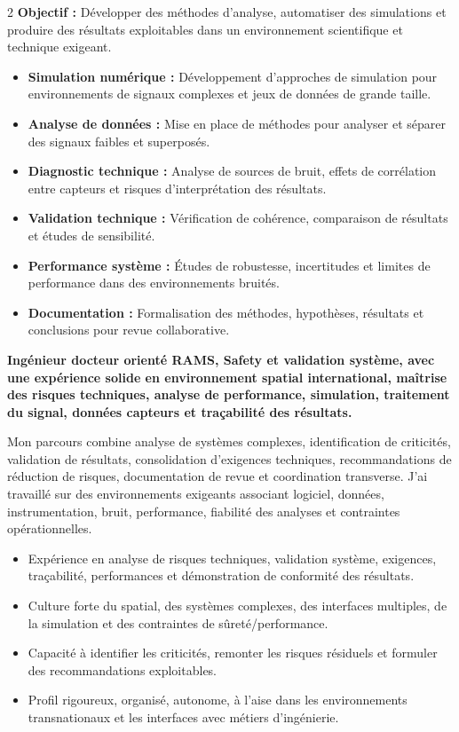 \documentclass[8pt,a4paper,ragged2e,withhyper]{altacv}
\begin{document}
\begin{paracol}{2}
\textbf{Objectif :} Développer des méthodes d’analyse, automatiser des simulations et produire des résultats exploitables dans un environnement scientifique et technique exigeant.

\begin{itemize}
  \item \textbf{Simulation numérique :} Développement d’approches de simulation pour environnements de signaux complexes et jeux de données de grande taille.
  \item \textbf{Analyse de données :} Mise en place de méthodes pour analyser et séparer des signaux faibles et superposés.
  \item \textbf{Diagnostic technique :} Analyse de sources de bruit, effets de corrélation entre capteurs et risques d’interprétation des résultats.
  \item \textbf{Validation technique :} Vérification de cohérence, comparaison de résultats et études de sensibilité.
  \item \textbf{Performance système :} Études de robustesse, incertitudes et limites de performance dans des environnements bruités.
  \item \textbf{Documentation :} Formalisation des méthodes, hypothèses, résultats et conclusions pour revue collaborative.
\end{itemize}

\switchcolumn


\textbf{Ingénieur docteur orienté RAMS, Safety et validation système, avec une expérience solide en environnement spatial international, maîtrise des risques techniques, analyse de performance, simulation, traitement du signal, données capteurs et traçabilité des résultats.}

Mon parcours combine analyse de systèmes complexes, identification de criticités, validation de résultats, consolidation d’exigences techniques, recommandations de réduction de risques, documentation de revue et coordination transverse. J’ai travaillé sur des environnements exigeants associant logiciel, données, instrumentation, bruit, performance, fiabilité des analyses et contraintes opérationnelles.

\begin{itemize}
  \item Expérience en analyse de risques techniques, validation système, exigences, traçabilité, performances et démonstration de conformité des résultats.
  \item Culture forte du spatial, des systèmes complexes, des interfaces multiples, de la simulation et des contraintes de sûreté/performance.
  \item Capacité à identifier les criticités, remonter les risques résiduels et formuler des recommandations exploitables.
  \item Profil rigoureux, organisé, autonome, à l’aise dans les environnements transnationaux et les interfaces avec métiers d’ingénierie.
\end{itemize}


\end{paracol}
\end{document}
